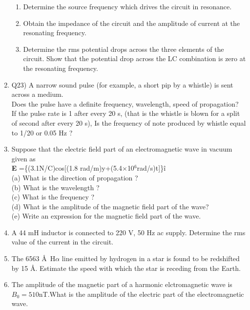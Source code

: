 \begin{enumerate}[label=\thesection.\arabic*,ref=\thesection.\theenumi]
\begin{enumerate}
    \item Determine the source frequency which drives the circuit in resonance.
    \item Obtain the impedance of the circuit and the amplitude of current
at the resonating frequency.
    \item Determine the rms potential drops across the three elements of
the circuit. Show that the potential drop across the LC
combination is zero at the resonating frequency.\\
\end{enumerate}
\solution
\pagebreak

\item Q23) A narrow sound pulse (for example, a short pip by a whistle) is sent across a
	medium.\\  Does the pulse have a definite  frequency,  wavelength,  speed
	of propagation?\\[1ex] If the pulse rate is 1 after every 20 s, (that is the whistle is
	blown for a split of second after every 20 s), Is the frequency of note produced
	by whistle equal to 1/20 or 0.05 Hz ?\\
\solution
\pagebreak
\item Suppose that the electric field part of an electromagnetic wave in vacuum given as\\ \textbf{E} =\{(3.1N/C)cos[(1.8 rad/m)y+(5.4$\times$10$^{6}$rad/s)t]\}\^i \\
(a) What is the direction of propagation ?\\
(b) What is the wavelength ? \\
(c) What is the frequency ?\\
(d) What is the amplitude of the magnetic field part of the wave?\\
(e) Write an expression for the magnetic field part of the wave.\\
\solution
\pagebreak

\item A 44 mH inductor is connected to 220 V, 50 Hz ac supply. Determine
the rms value of the current in the circuit.\\
\solution
\pagebreak

\item The 6563 \AA\, H$\alpha$ line emitted by hydrogen in a star is found to be redshifted by 15 \AA. Estimate the speed with which the star is receding from the Earth.
\solution
\pagebreak
\item The amplitude  of the magnetic part of a harmonic elctromagnetic wave is $B_0=510$nT.What is the amplitude of the electric part of the electromagnetic wave.\\
\solution
\pagebreak


\end{enumerate}
